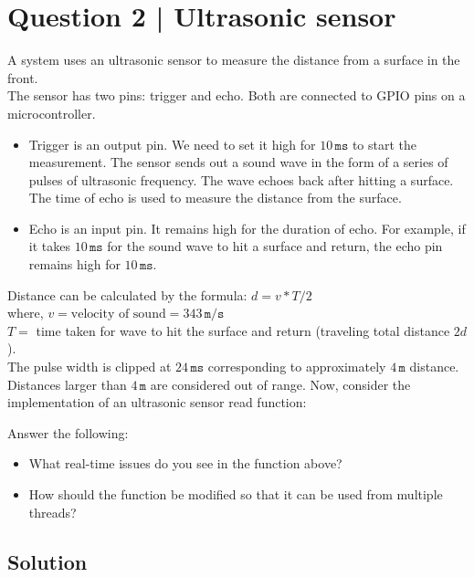 \section*{Question 2 | Ultrasonic sensor}

A system uses an ultrasonic sensor to measure the distance from a surface in the front. \\
The sensor has two pins: trigger and echo.
Both are connected to GPIO pins on a microcontroller.
\begin{itemize}[noitemsep, topsep=0pt, leftmargin=*]
    \item
          Trigger is an output pin.
          We need to set it high for \( 10 \, \texttt{ms} \) to start the measurement.
          The sensor sends out a sound wave in the form of a series of pulses of ultrasonic frequency.
          The wave echoes back after hitting a surface.
          The time of echo is used to measure the distance from the surface.
    \item
          Echo is an input pin.
          It remains high for the duration of echo.
          For example, if it takes \( 10 \, \texttt{ms} \) for the sound wave to hit a surface and return, the echo pin remains high for \( 10 \, \texttt{ms} \).
\end{itemize}
Distance can be calculated by the formula: \( d = v * T / 2 \) \\
where, \( v = \text{velocity of sound} = 343 \, \texttt{m/s} \) \\
\( T = \) time taken for wave to hit the surface and return (traveling total distance \( 2d \)). \\
The pulse width is clipped at \( 24 \, \texttt{ms} \) corresponding to approximately \( 4 \, \texttt{m} \) distance.
Distances larger than \( 4 \, \texttt{m} \) are considered out of range.
Now, consider the implementation of an ultrasonic sensor read function:

Answer the following:
\begin{itemize}[noitemsep, topsep=0pt]
    \item What real-time issues do you see in the function above?
    \item How should the function be modified so that it can be used from multiple threads?
\end{itemize}

\clearpage
\subsection*{Solution}

